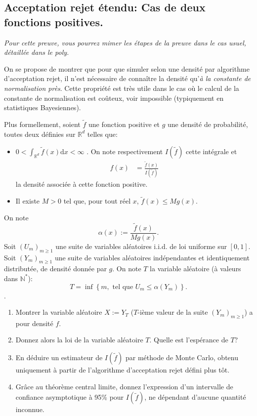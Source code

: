 \documentclass[]{article}
\providecommand{\tightlist}{%
  \setlength{\itemsep}{0pt}\setlength{\parskip}{0pt}}
\begin{document}
\hypertarget{acceptation-rejet-uxe9tendu-cas-de-deux-fonctions-positives.}{%
\subsection{Acceptation rejet étendu: Cas de deux fonctions
positives.}\label{acceptation-rejet-uxe9tendu-cas-de-deux-fonctions-positives.}}

\emph{Pour cette preuve, vous pourrez mimer les étapes de la preuve dans
le cas usuel, détaillée dans le poly.}

On se propose de montrer que pour que simuler selon une densité par
algorithme d'acceptation rejet, il n'est nécessaire de connaître la
densité qu'\emph{à la constante de normalisation près}. Cette propriété
est très utile dans le cas où le calcul de la constante de normalisation
est coûteux, voir impossible (typiquement en statistiques Bayesiennes).

Plus formellement, soient \(\tilde{f}\) une fonction positive et \(g\)
une densité de probabilité, toutes deux définies sur \(\mathbb{R}^d\)
telles que:

\begin{itemize}
\tightlist
\item
  \(0 < \int_{\mathbb{R}^d}\tilde{f}(x)\text{d}x < \infty\) . On note
  respectivement \(I(\tilde{f})\) cette intégrale et \begin{align*}
  f(x) &= \frac{\tilde{f}(x)}{I(\tilde{f})}
  \end{align*} la densité associée à cette fonction positive.
\item
  Il existe \(M>0\) tel que, pour tout réel \(x\),
  \(\tilde{f}(x) \leq M g(x)\).
\end{itemize}

On note \[\alpha(x) := \frac{\tilde{f}(x)}{Mg(x)}.\] Soit
\((U_m)_{m\geq 1}\) une suite de variables aléatoires i.i.d. de loi
uniforme sur \([0, 1]\). Soit \((Y_m)_{m\geq 1}\) une suite de variables
aléatoires indépendantes et identiquement distributée, de densité donnée
par \(g\). On note \(T\) la variable aléatoire (à valeurs dans
\(\mathbb{N}^*\)):
\[T = \inf\left\lbrace m, \text{ tel que } U_m \leq \alpha(Y_m)\right\rbrace.\].

\begin{enumerate}
\def\labelenumi{\arabic{enumi}.}
\item
  Montrer la variable aléatoire \(X := Y_T\) (\(T\)-ième valeur de la
  suite \((Y_m)_{m\geq 1}\)) a pour densité \(f\).
\item
  Donnez alors la loi de la variable aléatoire \(T\). Quelle est
  l'espérance de \(T\)?
\item
  En déduire un estimateur de \(I(\tilde{f})\) par méthode de Monte
  Carlo, obtenu uniquement à partir de l'algorithme d'acceptation rejet
  défini plus tôt.
\item
  Grâce au théorème central limite, donnez l'expression d'un intervalle
  de confiance asymptotique à 95\% pour \(I(\tilde{f})\), ne dépendant
  d'aucune quantité inconnue.
\end{enumerate}
\end{document}
